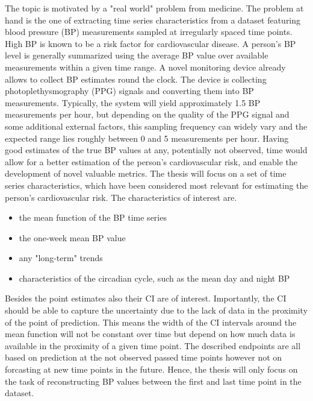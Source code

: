 The topic is motivated by a "real world" problem from medicine.
%
The problem at hand is the one of extracting time series characteristics from a dataset
featuring blood pressure (BP) measurements sampled at irregularly spaced time points.
High BP is known to be a risk factor for cardiovascular disease.
A person’s BP level is generally summarized using the average BP value over available measurements within a given time range.
A novel monitoring device already allows to collect BP estimates round the clock.
The device is collecting photoplethysmography (PPG) signals and converting them into BP measurements.
Typically, the system will yield approximately 1.5 BP measurements per hour, but depending on the quality of the PPG signal and some additional external factors,
this sampling frequency can widely vary and the expected range lies roughly between 0 and 5 measurements per hour.
Having good estimates of the true BP values at any, potentially not observed, time would allow for a better estimation
of the person’s cardiovascular risk, and enable the development of novel valuable metrics.
The thesis will focus on a set of time series characteristics, which have been considered most relevant for estimating
the person’s cardiovascular risk.
The characteristics of interest are.
\begin{itemize}
    \item the mean function of the BP time series
    \item the one-week mean BP value
    \item any "long-term" trends
    \item characteristics of the circadian cycle, such as the mean day and night BP
\end{itemize}
Besides the point estimates also their CI are of interest.
Importantly, the CI should be able to capture the uncertainty due to the lack of data in the proximity of the point of prediction.
This means the width of the CI intervals around the mean function will not be constant over time but depend on how much
data is available in the proximity of a given time point.
The described endpoints are all based on prediction at the not observed passed time points however not on forcasting at new time points in
the future.
Hence, the thesis will only focus on the task of reconstructing BP values between the first and last time point in the dataset.

